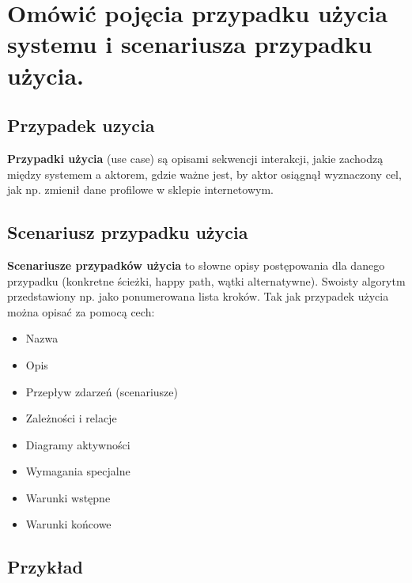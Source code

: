 \section{Omówić pojęcia przypadku użycia systemu i scenariusza przypadku użycia.}

\subsection{Przypadek uzycia}

\textbf{Przypadki użycia} (use case) są opisami sekwencji interakcji, jakie zachodzą między systemem a aktorem,
gdzie ważne jest, by aktor osiągnął wyznaczony cel, jak np. zmienił dane profilowe w sklepie internetowym.

\subsection{Scenariusz przypadku użycia}

\textbf{Scenariusze przypadków użycia} to słowne opisy postępowania dla danego przypadku
(konkretne ścieżki, happy path, wątki alternatywne).
Swoisty algorytm przedstawiony np. jako ponumerowana lista kroków.
Tak jak przypadek użycia można opisać za pomocą cech:
\begin{itemize}[itemsep=0pt,partopsep=0pt, parsep=0pt]
    \item Nazwa
    \item Opis
    \item Przepływ zdarzeń (scenariusze)
    \item Zależności i relacje
    \item Diagramy aktywności
    \item Wymagania specjalne
    \item Warunki wstępne
    \item Warunki końcowe
\end{itemize}

\subsection{Przykład}


